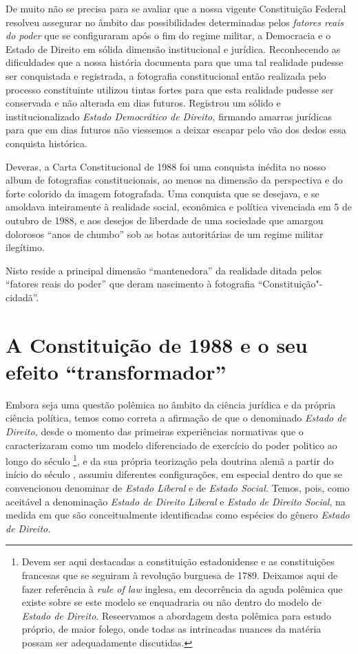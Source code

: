 De muito não se precisa para se avaliar que a nossa vigente Constituição
Federal resolveu assegurar no âmbito das possibilidades determinadas
pelos \emph{fatores reais do poder} que se configuraram após o fim do
regime militar, a Democracia e o Estado de Direito em sólida dimensão
institucional e jurídica. Reconhecendo as dificuldades que a nossa
história documenta para que uma tal realidade pudesse ser conquistada e
registrada, a fotografia constitucional então realizada pelo processo
constituinte utilizou tintas fortes para que esta realidade pudesse ser
conservada e não alterada em dias futuros. Registrou um sólido e
institucionalizado \emph{Estado Democrático de Direito,} firmando
amarras jurídicas para que em dias futuros não viessemos a deixar
escapar pelo vão dos dedos essa conquista histórica.

Deveras, a Carta Constitucional de 1988 foi uma conquista inédita no
nosso album de fotografias constitucionais, ao menos na dimensão da
perspectiva e do forte colorido da imagem fotografada. Uma conquista que
se desejava, e se amoldava inteiramente à realidade social, econômica e
política vivenciada em 5 de outubro de 1988, e aos desejos de liberdade
de uma sociedade que amargou dolorosos ``anos de chumbo'' sob as
botas autoritárias de um regime militar ilegítimo.

Nisto reside a principal dimensão ``mantenedora'' da realidade
ditada pelos ``fatores reais do poder'' que deram nascimento à
fotografia ``Constituição"-cidadã''.

\section{A Constituição de 1988 e o seu efeito
``transformador''}

Embora seja uma questão polêmica no âmbito da ciência jurídica e da
própria ciência política, temos como correta a afirmação de que o
denominado \emph{Estado de Direito,} desde o momento das primeiras
experiências normativas que o caracterizaram como um modelo diferenciado
de exercício do poder politico ao longo do século \footnote{Devem
  ser aqui destacadas a constituição estadonidense e as constituições
  francesas que se seguiram à revolução burguesa de 1789. Deixamos aqui
  de fazer referência à \emph{rule of law} inglesa, em decorrência da
  aguda polêmica que existe sobre se este modelo se enquadraria ou não
  dentro do modelo de \emph{Estado de Direito}. Reseervamos a abordagem
  desta polêmica para estudo próprio, de maior folego, onde todas as
  intrincadas nuances da matéria possam ser adequadamente discutidas.},
e da sua própria teorização pela doutrina alemã a partir do início do
século , assumiu diferentes configurações, em especial dentro do que
se convencionou denominar de \emph{Estado Liberal} e de \emph{Estado
Social.} Temos, pois, como aceitável a denominação \emph{Estado de
Direito Liberal} e \emph{Estado de Direito Social}, na medida em que são
conceitualmente identificadas como espécies do gênero \emph{Estado de
Direito.}

